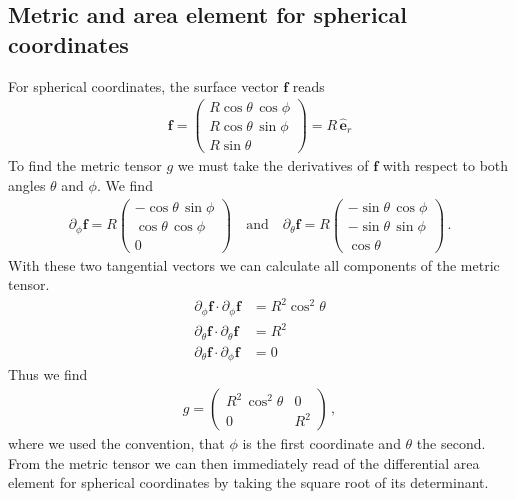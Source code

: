 \documentclass[11pt, DINA4, fleqn]{amsart}
\begin{document}
\subsection{Metric and area element for spherical coordinates}
For spherical coordinates, the surface vector $\boldsymbol{f}$ reads
\begin{align}
\boldsymbol{f} = \begin{pmatrix}
R \cos\theta \, \cos\phi \\
R \cos\theta \, \sin\phi \\
R \sin\theta
\end{pmatrix} = R\, \hat{\boldsymbol{e}}_r
\end{align}
To find the metric tensor $g$ we must take the derivatives of $\boldsymbol{f}$ with respect to both angles $\theta$ and $\phi$.
We find
\begin{align}
\partial_{\phi}\boldsymbol{f} = R \begin{pmatrix}
-\cos\theta\, \sin\phi \\
\cos\theta\, \cos\phi \\
0
\end{pmatrix}
\quad \text{and} \quad
\partial_{\theta}\boldsymbol{f} = R \begin{pmatrix}
-\sin\theta\, \cos\phi \\
-\sin\theta\, \sin\phi \\
\cos\theta
\end{pmatrix}
 \, .
\end{align}
With these two tangential vectors we can calculate all components of the metric tensor.
\begin{align}
\partial_{\phi}\boldsymbol{f} \cdot \partial_{\phi}\boldsymbol{f} &= 
R^2\cos^2\theta \\
\partial_{\theta}\boldsymbol{f} \cdot \partial_{\theta}\boldsymbol{f} &= 
R^2 \\
\partial_{\theta}\boldsymbol{f}\cdot \partial_{\phi}\boldsymbol{f} &= 0
\end{align}
Thus we find
\begin{align}
g = \begin{pmatrix}
R^2\, \cos^2\theta & 0 \\
0 & R^2
\end{pmatrix} \, ,
\end{align}
where we used the convention, that $\phi$ is the first coordinate and $\theta$ the second.
From the metric tensor we can then immediately read of the differential area element for spherical coordinates by taking the square root of its determinant.
\end{document}
